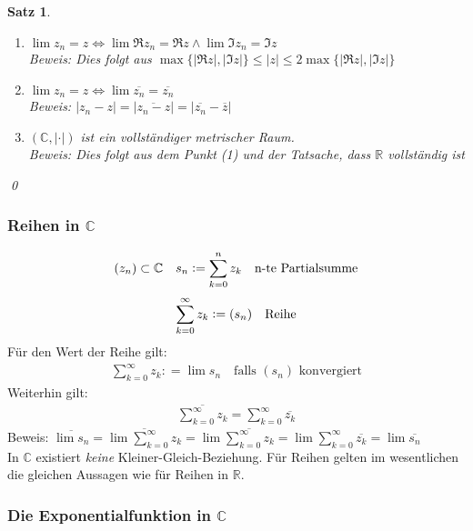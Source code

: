 \documentclass[ngerman,titlepage,twoside, parskip=half*]{scrreprt}
\newcommand*{\R}{\mathbb{R}}
\newcommand*{\C}{\mathbb{C}}
\theoremstyle{plain}
\newtheorem{theorem}{Satz}[section]
\theoremstyle{definition}
\theoremstyle{remark}
\newcommand*{\abs}[2][]{#1\lvert#2#1\rvert}
\newcommand*{\coloneqq}{\mathrel{\mathop:}=}
\begin{document}
\begin{theorem}
\begin{enumerate}[(1)]
  \item $\lim z_n=z\Leftrightarrow \lim\Re z_n =\Re z \wedge \lim \Im z_n=\Im z$\\
    Beweis: Dies folgt aus $\max\{\abs{\Re z},\abs{\Im z}\}\leq \abs{z}\leq 2\max\{\abs{\Re z},\abs{\Im z}\}$
  \item $\lim z_n=z\Leftrightarrow \lim \overline{z_n}=\overline{z_n}$\\
    Beweis: $\abs{z_n-z}=\abs{\overline{z_n-z}}=\abs{\overline{z_n}-\overline{z}}$
  \item $(\C,\abs{\cdot })$ ist ein vollständiger metrischer Raum.\\
    Beweis: Dies folgt aus dem Punkt (1) und der Tatsache, dass $\R$ vollständig ist
\end{enumerate}
\qed
\end{theorem}

\subsubsection{Reihen in $\C$}
\begin{gather*}(z_n)\subset \C\quad s_n\coloneqq\sum_{k=0}^n z_k \quad \text{n-te Partialsumme\index{Partialsumme}}\end{gather*}
\begin{gather*}\sum_{k=0}^{\infty} z_k\coloneqq(s_n) \quad \text{Reihe\index{Reihe}}\end{gather*}
Für den Wert der Reihe gilt:
\begin{gather*}\sum_{k=0}^{\infty} z_k\coloneqq\lim s_n \quad \text{falls }(s_n) \text{ konvergiert}\end{gather*}
Weiterhin gilt:
\begin{gather*}\overline{\sum_{k=0}^{\infty} z_k}=\sum_{k=0}^\infty \overline{z_k}\end{gather*}
Beweis: $\overline{\lim s_n}=\overline{\lim\sum_{k=0}^\infty z_k}=\lim \overline{\sum_{k=0}^\infty
z_k}=\lim \sum_{k=0}^\infty \overline{z_k}=\lim \overline{s_n}$\\
In $\C$ existiert \emph{keine} Kleiner-Gleich-Beziehung. Für Reihen gelten im wesentlichen die
gleichen Aussagen wie für Reihen in $\R$.

\subsubsection{Die Exponentialfunktion in $\C$}
\end{document}
